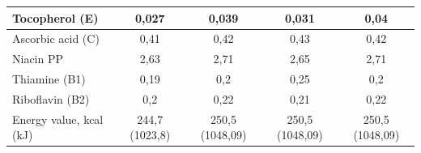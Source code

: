 \begin{table}[H]
\begin{tabular}{|lcccc|}
\multicolumn{1}{|l|}{Tocopherol (E)}          & \multicolumn{1}{c|}{0,027}           & \multicolumn{1}{c|}{0,039}                                         & \multicolumn{1}{c|}{0,031}                                         & 0,04                                                               \\ \hline
\multicolumn{1}{|l|}{Ascorbic acid (C)}       & \multicolumn{1}{c|}{0,41}            & \multicolumn{1}{c|}{0,42}                                          & \multicolumn{1}{c|}{0,43}                                          & 0,42                                                               \\ \hline
\multicolumn{1}{|l|}{Niacin PP}               & \multicolumn{1}{c|}{2,63}            & \multicolumn{1}{c|}{2,71}                                          & \multicolumn{1}{c|}{2,65}                                          & 2,71                                                               \\ \hline
\multicolumn{1}{|l|}{Thiamine (B1)}           & \multicolumn{1}{c|}{0,19}            & \multicolumn{1}{c|}{0,2}                                           & \multicolumn{1}{c|}{0,25}                                          & 0,2                                                                \\ \hline
\multicolumn{1}{|l|}{Riboflavin (B2)}         & \multicolumn{1}{c|}{0,2}             & \multicolumn{1}{c|}{0,22}                                          & \multicolumn{1}{c|}{0,21}                                          & 0,22                                                               \\ \hline
\multicolumn{1}{|l|}{Energy value, kcal (kJ)} & \multicolumn{1}{c|}{244,7 (1023,8)}  & \multicolumn{1}{c|}{250,5 (1048,09)}                               & \multicolumn{1}{c|}{250,5 (1048,09)}                               & 250,5 (1048,09)                                                    \\ \hline
\end{tabular}
\end{table}

